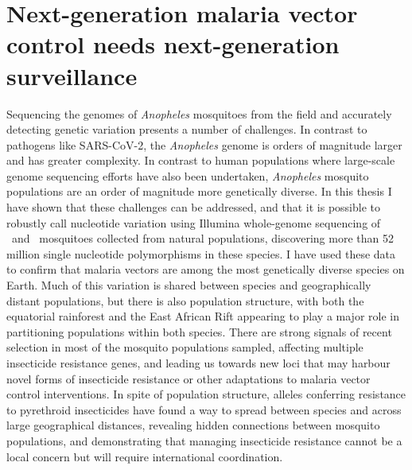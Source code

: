 \documentclass[a4paper,11pt,abstracton,hidelinks]{scrartcl}
\begin{document}
\section{Next-generation malaria vector control needs next-generation surveillance}\label{sec:nextgen}


Sequencing the genomes of \textit{Anopheles} mosquitoes from the field and accurately detecting genetic variation presents a number of challenges.
%
In contrast to pathogens like SARS-CoV-2, the \textit{Anopheles} genome is orders of magnitude larger and has greater complexity.
%
In contrast to human populations where large-scale genome sequencing efforts have also been undertaken, \textit{Anopheles} mosquito populations are an order of magnitude more genetically diverse.
%
In this thesis I have shown that these challenges can be addressed, and that it is possible to robustly call nucleotide variation using Illumina whole-genome sequencing of \agam\ and \acol\ mosquitoes collected from natural populations, discovering more than 52 million single nucleotide polymorphisms in these species.
%
I have used these data to confirm that malaria vectors are among the most genetically diverse species on Earth.
%
Much of this variation is shared between species and geographically distant populations, but there is also population structure, with both the equatorial rainforest and the East African Rift appearing to play a major role in partitioning populations within both species.
%
There are strong signals of recent selection in most of the mosquito populations sampled, affecting multiple insecticide resistance genes, and leading us towards new loci that may harbour novel forms of insecticide resistance or other adaptations to malaria vector control interventions.
%
In spite of population structure, alleles conferring resistance to pyrethroid insecticides have found a way to spread between species and across large geographical distances, revealing hidden connections between mosquito populations, and demonstrating that managing insecticide resistance cannot be a local concern but will require international coordination.
\end{document}
